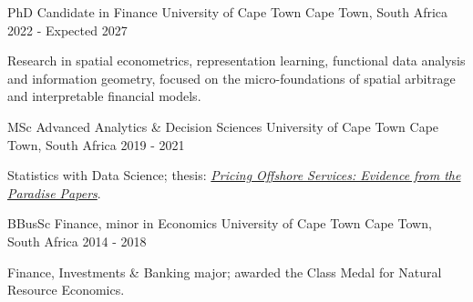 \begin{cventries}
  \cventry
  {PhD Candidate in Finance}
  {University of Cape Town}
  {Cape Town, South Africa}
  {2022 - Expected 2027}
  {
    \begin{cvitems}
    \item {Research in spatial econometrics, representation learning,
        functional data analysis and information geometry, focused on
        the micro-foundations of spatial arbitrage and interpretable
      financial models.}
    \end{cvitems}
  }

  \cventry
  {MSc Advanced Analytics \& Decision Sciences}
  {University of Cape Town}
  {Cape Town, South Africa}
  {2019 - 2021}
  {
    \begin{cvitems}
    \item {Statistics with Data Science; thesis:
        \href{https://open.uct.ac.za/handle/11427/36849}{\textit{Pricing
      Offshore Services: Evidence from the Paradise Papers}}.}
    \end{cvitems}
  }

  \cventry
  {BBusSc Finance, minor in Economics}
  {University of Cape Town}
  {Cape Town, South Africa}
  {2014 - 2018}
  {
    \begin{cvitems}
    \item {Finance, Investments \& Banking major; awarded the Class
      Medal for Natural Resource Economics.}
    \end{cvitems}
  }
\end{cventries}
